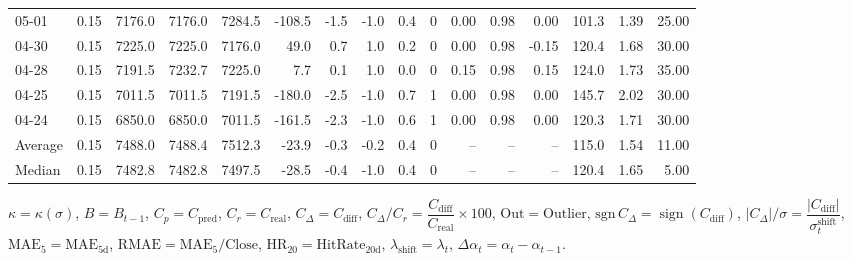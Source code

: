 \begin{threeparttable}
{\begin{tabular}{lrrrrrrrrrrrrrrr}
  05-01 &     0.15 & 7176.0 & 7176.0 & 7284.5 &     -108.5 &           -1.5 &                     -1.0 &                 0.4 &              0 &       0.00 &      0.98 &           0.00 &            101.3 &            1.39 &                  25.00 \\
  04-30 &     0.15 & 7225.0 & 7225.0 & 7176.0 &       49.0 &            0.7 &                      1.0 &                 0.2 &              0 &       0.00 &      0.98 &          -0.15 &            120.4 &            1.68 &                  30.00 \\
  04-28 &     0.15 & 7191.5 & 7232.7 & 7225.0 &        7.7 &            0.1 &                      1.0 &                 0.0 &              0 &       0.15 &      0.98 &           0.15 &            124.0 &            1.73 &                  35.00 \\
  04-25 &     0.15 & 7011.5 & 7011.5 & 7191.5 &     -180.0 &           -2.5 &                     -1.0 &                 0.7 &              1 &       0.00 &      0.98 &           0.00 &            145.7 &            2.02 &                  30.00 \\
  04-24 &     0.15 & 6850.0 & 6850.0 & 7011.5 &     -161.5 &           -2.3 &                     -1.0 &                 0.6 &              1 &       0.00 &      0.98 &           0.00 &            120.3 &            1.71 &                  30.00 \\
Average &     0.15 & 7488.0 & 7488.4 & 7512.3 &      -23.9 &           -0.3 &                     -0.2 &                 0.4 &              0 &         -- &        -- &             -- &            115.0 &            1.54 &                  11.00 \\
 Median &     0.15 & 7482.8 & 7482.8 & 7497.5 &      -28.5 &           -0.4 &                     -1.0 &                 0.4 &              0 &         -- &        -- &             -- &            120.4 &            1.65 &                   5.00 \\
\bottomrule
\end{tabular}
}
\begin{tablenotes}\footnotesize
\item $\kappa=\kappa(\sigma)$, $B=B_{t-1}$, $C_p=C_{\text{pred}}$, $C_r=C_{\text{real}}$, $C_\Delta=C_{\text{diff}}$, $C_\Delta/C_r=\dfrac{C_{\text{diff}}}{C_{\text{real}}}\times100$, $\mathrm{Out}=\text{Outlier}$, $\mathrm{sgn}\,C_\Delta=\operatorname{sign}(C_{\text{diff}})$, $|C_\Delta|/\sigma=\dfrac{|C_{\text{diff}}|}{\sigma_t^{\text{shift}}}$, $\mathrm{MAE}_5=\mathrm{MAE}_{5\text{d}}$, $\mathrm{RMAE}= \mathrm{MAE}_5 / \text{Close}$, $\mathrm{HR}_{20}=\mathrm{HitRate}_{20\text{d}}$, 
$\lambda_{\text{shift}}=\lambda_t$, 
$\Delta\alpha_t=\alpha_t-\alpha_{t-1}$.
\end{tablenotes}
\end{threeparttable}
\endgroup

